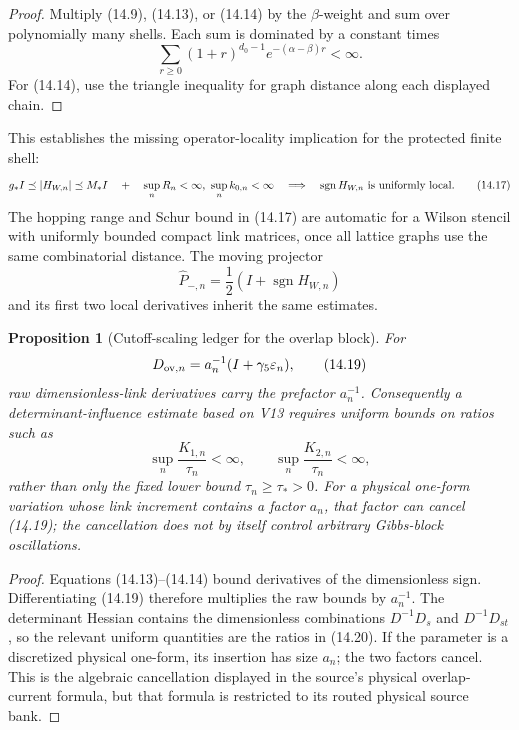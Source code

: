 \documentclass[11pt]{article}
\newtheorem{proposition}[theorem]{Proposition}
\theoremstyle{remark}
\begin{document}
\begin{proof}
Multiply (14.9), (14.13), or (14.14) by the
\(\beta\)-weight and sum over polynomially many shells.  Each sum
is dominated by a constant times
\[
 \sum_{r\ge0}(1+r)^{d_0-1}e^{-(\alpha-\beta)r}<\infty.
\]
For (14.14), use the triangle inequality for graph distance along
each displayed chain.
\end{proof}

This establishes the missing operator-locality implication for the
protected finite shell:
\[
 g_*I\preceq |H_{W,n}|\preceq M_*I
 \quad+\quad
 \sup_n R_n<\infty,\ \sup_n k_{0,n}<\infty
 \quad\Longrightarrow\quad
 \operatorname{sgn}H_{W,n}\ \hbox{is uniformly local}.       \tag{14.17}
\]
The hopping range and Schur bound in (14.17) are automatic for a
Wilson stencil with uniformly bounded compact link matrices, once
all lattice graphs use the same combinatorial distance.  The
moving projector
\[
 \widehat P_{-,n}=\frac12(I+\operatorname{sgn}H_{W,n})        \tag{14.18}
\]
and its first two local derivatives inherit the same estimates.

\begin{proposition}[Cutoff-scaling ledger for the overlap block]
\label{prop:v15v14-scaling}
For
\[
 D_{{\rm ov},n}=a_n^{-1}(I+\gamma_5\varepsilon_n),           \tag{14.19}
\]
raw dimensionless-link derivatives carry the prefactor
\(a_n^{-1}\).  Consequently a determinant-influence estimate based
on V13 requires uniform bounds on ratios such as
\[
 \sup_n\frac{K_{1,n}}{\tau_n}<\infty,\qquad
 \sup_n\frac{K_{2,n}}{\tau_n}<\infty,                        \tag{14.20}
\]
rather than only the fixed lower bound \(\tau_n\ge\tau_*>0\).
For a physical one-form variation whose link increment contains a
factor \(a_n\), that factor can cancel (14.19); the cancellation
does not by itself control arbitrary Gibbs-block oscillations.
\end{proposition}

\begin{proof}
Equations (14.13)--(14.14) bound derivatives of the dimensionless
sign.  Differentiating (14.19) therefore multiplies the raw bounds
by \(a_n^{-1}\).  The determinant Hessian contains the dimensionless
combinations \(D^{-1}D_s\) and \(D^{-1}D_{st}\), so the relevant
uniform quantities are the ratios in (14.20).  If the parameter is
a discretized physical one-form, its insertion has size \(a_n\);
the two factors cancel.  This is the algebraic cancellation
displayed in the source's physical overlap-current formula, but
that formula is restricted to its routed physical source bank.
\end{proof}
\end{document}

